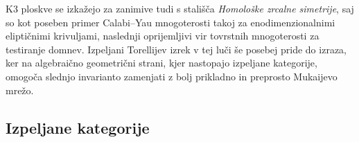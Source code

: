 %
%

K3 ploskve se izkažejo za zanimive tudi s stališča \emph{Homološke zrcalne simetrije}, saj so kot poseben primer Calabi--Yau mnogoterosti takoj za enodimenzionalnimi eliptičnimi krivuljami, naslednji oprijemljivi vir tovrstnih mnogoterosti za testiranje domnev. Izpeljani Torellijev izrek v tej luči še posebej pride do izraza, ker na algebraično geometrični strani, kjer nastopajo izpeljane kategorije, omogoča slednjo invarianto zamenjati z bolj prikladno in preprosto Mukaijevo mrežo.  

\subsection*{Izpeljane kategorije}

